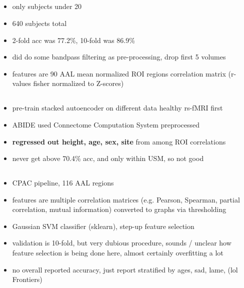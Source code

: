 \documentclass[10pt]{article}
\begin{document}
\subsection{\citet{iidakaRestingStateFunctional2015}}

\begin{itemize}
  \item only subjects under 20
  \item 640 subjects total
  \item 2-fold acc was 77.2\%, 10-fold was 86.9\%
  \item did do some bandpass filtering as pre-processing, drop first 5 volumes
  \item features are 90 AAL mean normalized ROI regions correlation matrix (r-values fisher
  normalized to Z-scores)
\end{itemize}

\subsection{\citet{liNovelTransferLearning2018}}

\begin{itemize}
  \item pre-train stacked autoencoder on different data healthy rs-fMRI first
  \item ABIDE used Connectome Computation System preprocessed
  \item \textbf{regressed out height, age, sex, site} from among ROI correlations
  \item never get above 70.4\% acc, and only within USM, so not good
\end{itemize}

\subsection{\citet{kazeminejadTopologicalPropertiesRestingState2019}}

\begin{itemize}
  \item CPAC pipeline, 116 AAL regions
  \item features are multiple correlation matrices (e.g. Pearson, Spearman, partial correlation,
  mutual information) converted to graphs via thresholding
  \item Gaussian SVM classifier (sklearn), step-up feature selection
  \item validation is 10-fold, but very dubious procedure, sounds / unclear how feature selection is
  being done here, almost certainly overfitting a lot
  \item no overall reported accuracy, just report stratified by ages, sad, lame, (lol Frontiers)
\end{itemize}
\end{document}

